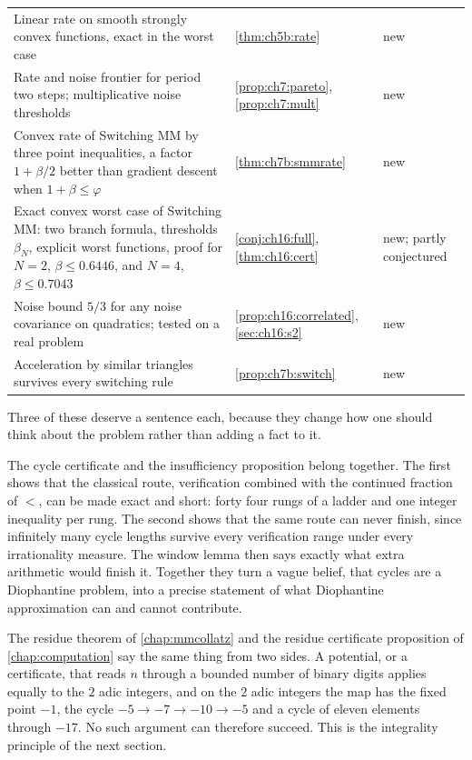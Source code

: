 {\begin{longtable}{@{}p{}>{\raggedright\arraybackslash}p{}>{\raggedright\arraybackslash}p{}@{}}
Linear rate on smooth strongly convex functions, exact in the worst case & \cref{thm:ch5b:rate} & new \\
Rate and noise frontier for period two steps; multiplicative noise thresholds & \cref{prop:ch7:pareto}, \cref{prop:ch7:mult} & new \\
Convex rate of Switching MM by three point inequalities, a factor $1+\beta/2$ better than gradient descent when $1+\beta\le\varphi$ & \cref{thm:ch7b:smmrate} & new \\
Exact convex worst case of Switching MM: two branch formula, thresholds $\beta_N$, explicit worst functions, proof for $N=2$, $\beta\le0.6446$, and $N=4$, $\beta\le0.7043$ & \cref{conj:ch16:full}, \cref{thm:ch16:cert} & new; partly conjectured \\
Noise bound $5/3$ for any noise covariance on quadratics; tested on a real problem & \cref{prop:ch16:correlated}, \cref{sec:ch16:s2} & new \\
Acceleration by similar triangles survives every switching rule & \cref{prop:ch7b:switch} & new \\
\end{longtable}}

Three of these deserve a sentence each, because they change how one should
think about the problem rather than adding a fact to it.

The cycle certificate and the insufficiency proposition belong together. The
first shows that the classical route, verification combined with the
continued fraction of $\lt$, can be made exact and short: forty four rungs of a
ladder and one integer inequality per rung. The second shows that the same
route can never finish, since infinitely many cycle lengths survive every
verification range under every irrationality measure. The window lemma then
says exactly what extra arithmetic would finish it. Together they turn a vague
belief, that cycles are a Diophantine problem, into a precise statement of what
Diophantine approximation can and cannot contribute.

The residue theorem of \cref{chap:mmcollatz} and the residue certificate
proposition of \cref{chap:computation} say the same thing from two sides. A
potential, or a certificate, that reads $n$ through a bounded number of binary digits
applies equally to the $2$ adic integers, and on the $2$ adic integers the map
has the fixed point $-1$, the cycle $-5\to-7\to-10\to-5$ and a cycle of
eleven elements through $-17$. No such
argument can therefore succeed. This is the integrality principle of the next
section.

